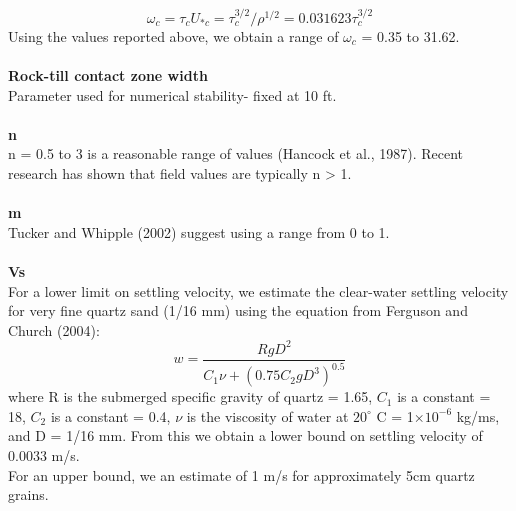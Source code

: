 \documentclass[12pt]{article}
\begin{document}
\begin{equation}
\omega_c = \tau_c U_{*c} = \tau_c^{3/2} / \rho^{1/2} = 0.031623 \tau_c^{3/2}
\end{equation}
\noindent
Using the values reported above, we obtain a range of $\omega_c$ = 0.35 to 31.62.
\\
\\
\noindent
{\textbf{Rock-till contact zone width}}
\\
Parameter used for numerical stability- fixed at 10 ft. 
\\
\\
\noindent
{\textbf{n}}
\\
n = 0.5 to 3 is a reasonable range of values (Hancock et al., 1987).
\noindent
Recent research has shown that field values are typically n > 1. 
\\
\\
\noindent
{\textbf{m}}
\\
Tucker and Whipple (2002) suggest using a range from 0 to 1. 
\\
\\
\noindent
{\textbf{Vs}}
\\
For a lower limit on settling velocity, we estimate the clear-water settling velocity for very fine quartz sand (1/16 mm) using the equation from Ferguson and Church (2004):
\begin{equation}
w = \frac{RgD^2}{C_1\nu+(0.75C_2gD^3)^{0.5}} 
\end{equation}
where R is the submerged specific gravity of quartz = 1.65, $C_1$ is a constant = 18, $C_2$ is a constant = 0.4, $\nu$ is the viscosity of water at $20^\circ$ C = 1$\times10^{-6}$ kg/ms, and D = 1/16 mm. From this we obtain a lower bound on settling velocity of 0.0033 m/s. 
\\
For an upper bound, we an estimate of 1 m/s for approximately 5cm quartz grains. 
\\
\\
\\
\noindent
\end{document}
